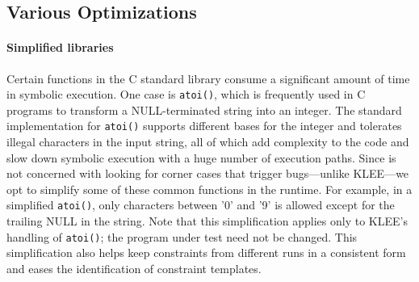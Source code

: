 
\subsection{Various Optimizations}
\paragraph{Simplified libraries}

Certain functions in the C standard library consume a significant amount of time in symbolic execution. One case is {\tt atoi()}, which is frequently used in C programs to transform a NULL-terminated string into an integer. The standard implementation for {\tt atoi()} supports different bases for the integer and tolerates illegal characters in the input string, all of which add complexity to the code and slow down symbolic execution with a huge number of execution paths. Since \lancet is not concerned with looking for corner cases that trigger bugs---unlike KLEE---we opt to simplify some of these common functions in the runtime. For example, in a simplified {\tt atoi()}, only characters between '0' and '9' is allowed except for the trailing NULL in the string. Note that this simplification applies only to KLEE's handling of {\tt atoi()}; the program under test need not be changed.
This simplification also helps keep constraints from different runs in a consistent form and eases the identification of constraint templates.


